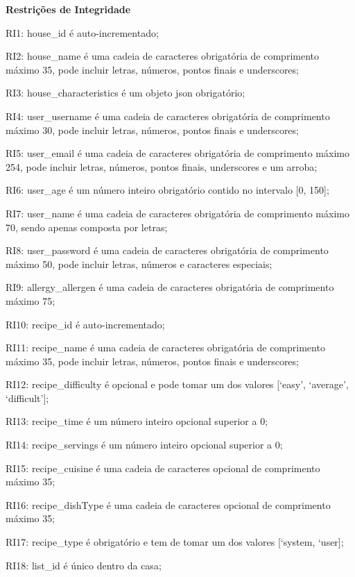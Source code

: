 \noindent\textbf{Restrições de Integridade}
\begin{description}
	\item RI1: house\_id é auto-incrementado;
	\item RI2: house\_name é uma cadeia de caracteres obrigatória de comprimento máximo 35, pode incluir letras, números, pontos finais e underscores;
	\item RI3: house\_characteristics é um objeto \acrshort{json} obrigatório;
	\item RI4: user\_username é uma cadeia de caracteres obrigatória de comprimento máximo 30, pode incluir letras, números, pontos finais e underscores;
	\item RI5: user\_email é uma cadeia de caracteres obrigatória de comprimento máximo 254, pode incluir letras, números, pontos finais, underscores e um arroba;
	\item RI6: user\_age é um número inteiro obrigatório contido no intervalo [0, 150];
	\item RI7: user\_name é uma cadeia de caracteres obrigatória de comprimento máximo 70, sendo apenas composta por letras;
	\item RI8: user\_password é uma cadeia de caracteres obrigatória de comprimento máximo 50, pode incluir letras, números e caracteres especiais;
	\item RI9: allergy\_allergen é uma cadeia de caracteres obrigatória de comprimento máximo 75;
	\item RI10: recipe\_id é auto-incrementado;
	\item RI11: recipe\_name é uma cadeia de caracteres obrigatória de comprimento máximo 35, pode incluir letras, números, pontos finais e underscores;
	\item RI12: recipe\_difficulty é opcional e pode tomar um dos valores [‘easy’, ‘average’, ‘difficult’];
	\item RI13: recipe\_time é um número inteiro opcional superior a 0;
	\item RI14: recipe\_servings é um número inteiro opcional superior a 0;
	\item RI15: recipe\_cuisine é uma cadeia de caracteres opcional de comprimento máximo 35;
	\item RI16: recipe\_dishType é uma cadeia de caracteres opcional de comprimento máximo 35;
	\item RI17: recipe\_type é obrigatório e tem de tomar um dos valores [‘system, ‘user];
	\item RI18: list\_id é único dentro da casa;

\end{description}
